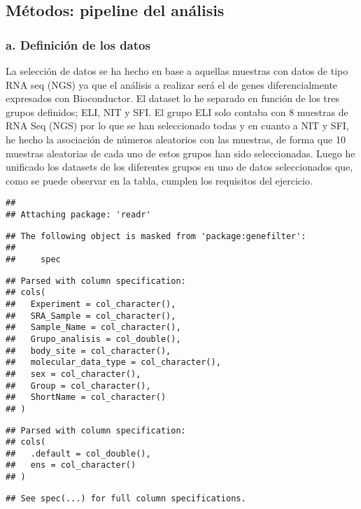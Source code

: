 \documentclass[
]{article}
\newenvironment{Shaded}{\begin{snugshade}}{\end{snugshade}}
\newcommand{\KeywordTok}[1]{\textcolor[rgb]{0.13,0.29,0.53}{\textbf{#1}}}
\newcommand{\NormalTok}[1]{#1}
\newcommand{\OperatorTok}[1]{\textcolor[rgb]{0.81,0.36,0.00}{\textbf{#1}}}
\newcommand{\StringTok}[1]{\textcolor[rgb]{0.31,0.60,0.02}{#1}}
\begin{document}
\subsection{Métodos: pipeline del análisis}
\subsubsection{a. Definición de los datos}

La selección de datos se ha hecho en base a aquellas muestras con datos
de tipo RNA seq (NGS) ya que el análisis a realizar será el de genes
diferencialmente expresados con Bioconductor. El dataset lo he separado
en función de los tres grupos definidos; ELI, NIT y SFI. El grupo ELI
solo contaba con 8 muestras de RNA Seq (NGS) por lo que se han
seleccionado todas y en cuanto a NIT y SFI, he hecho la asociación de
números aleatorios con las muestras, de forma que 10 muestras aleatorias
de cada uno de estos grupos han sido seleccionadas. Luego he unificado
los datasets de los diferentes grupos en uno de datos seleccionados que,
como se puede observar en la tabla, cumplen los requisitos del
ejercicio.

\begin{verbatim}
## 
## Attaching package: 'readr'
\end{verbatim}

\begin{verbatim}
## The following object is masked from 'package:genefilter':
## 
##     spec
\end{verbatim}

\begin{verbatim}
## Parsed with column specification:
## cols(
##   Experiment = col_character(),
##   SRA_Sample = col_character(),
##   Sample_Name = col_character(),
##   Grupo_analisis = col_double(),
##   body_site = col_character(),
##   molecular_data_type = col_character(),
##   sex = col_character(),
##   Group = col_character(),
##   ShortName = col_character()
## )
\end{verbatim}

\begin{verbatim}
## Parsed with column specification:
## cols(
##   .default = col_double(),
##   ens = col_character()
## )
\end{verbatim}

\begin{verbatim}
## See spec(...) for full column specifications.
\end{verbatim}

\begin{Shaded}
\end{Shaded}
\end{document}
